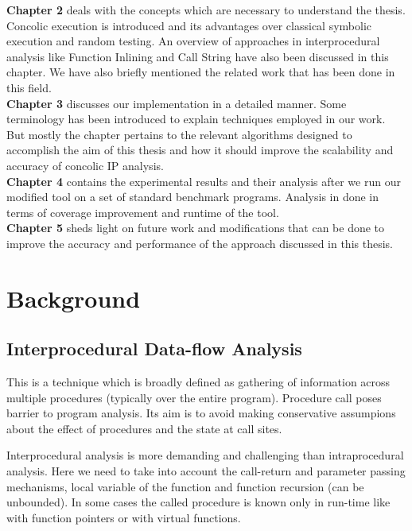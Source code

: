 \documentclass[12pt,oneside]{book}
\begin{document}
\textbf{Chapter 2} deals with the concepts which are necessary to understand the thesis. Concolic execution is introduced and its advantages over classical symbolic execution and random testing. An overview of approaches in interprocedural analysis like Function Inlining and Call String have also been discussed in this chapter. We have also briefly mentioned the related work that has been done in this field. \\

\textbf{Chapter 3} discusses our implementation in a detailed manner. Some terminology has been introduced to explain techniques employed in our work. But mostly the chapter pertains to the relevant algorithms designed to accomplish the aim of this thesis and how it should improve the scalability and accuracy of concolic IP analysis.\\

\textbf{Chapter 4} contains the experimental results and their analysis after we run our modified tool on a set of standard benchmark programs. Analysis in done in terms of coverage improvement and runtime of the tool.\\

\textbf{Chapter 5} sheds light on future work and modifications that can be done to improve the accuracy and performance of the approach discussed in this thesis.


\newpage
\chapter{Background}


\section {Interprocedural Data-flow Analysis}
This is a technique which is broadly defined as gathering of information across multiple procedures (typically over the entire program). Procedure call poses barrier to program analysis. Its aim is to avoid making conservative assumpions about the effect of procedures and the state at call sites.

Interprocedural analysis\cite{pnueli} is more demanding and challenging than intraprocedural analysis. Here we need to take into account the call-return and parameter passing mechanisms, local variable of the function and function recursion (can be unbounded). In some cases the called procedure is known only in run-time like with function pointers or with virtual functions. 
\end{document}
